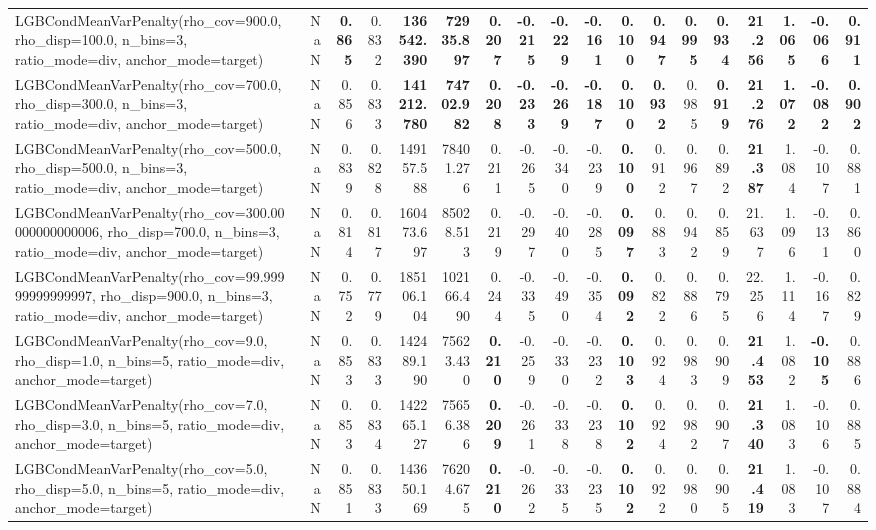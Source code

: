 \documentclass[11pt]{article}
\theoremstyle{plain}
\theoremstyle{definition}
\newcommand{\1}{\mathbf{1}}
\begin{document}
\begin{table}[htbp]
{\begin{tabular}{lrrrrrrrrrrrrrrrrr}
LGBCondMeanVarPenalty(rho\_cov=900.0, rho\_disp=100.0, n\_bins=3, ratio\_mode=div, anchor\_mode=target) & NaN & \textbf{0.865} & 0.832 & \textbf{136542.390} & \textbf{72935.897} & \textbf{0.207} & \textbf{-0.215} & \textbf{-0.229} & \textbf{-0.161} & \textbf{0.100} & \textbf{0.947} & \textbf{0.995} & \textbf{0.934} & \textbf{21.256} & \textbf{1.065} & \textbf{-0.066} & \textbf{0.911} \\
LGBCondMeanVarPenalty(rho\_cov=700.0, rho\_disp=300.0, n\_bins=3, ratio\_mode=div, anchor\_mode=target) & NaN & 0.856 & 0.833 & \textbf{141212.780} & \textbf{74702.982} & \textbf{0.208} & \textbf{-0.233} & \textbf{-0.269} & \textbf{-0.187} & \textbf{0.100} & \textbf{0.932} & 0.985 & \textbf{0.919} & \textbf{21.276} & \textbf{1.072} & \textbf{-0.082} & \textbf{0.902} \\
LGBCondMeanVarPenalty(rho\_cov=500.0, rho\_disp=500.0, n\_bins=3, ratio\_mode=div, anchor\_mode=target) & NaN & 0.839 & 0.828 & 149157.588 & 78401.276 & 0.211 & -0.265 & -0.340 & -0.239 & \textbf{0.100} & 0.912 & 0.967 & 0.892 & \textbf{21.387} & 1.084 & -0.107 & 0.881 \\
LGBCondMeanVarPenalty(rho\_cov=300.00000000000006, rho\_disp=700.0, n\_bins=3, ratio\_mode=div, anchor\_mode=target) & NaN & 0.814 & 0.817 & 160473.697 & 85028.513 & 0.219 & -0.297 & -0.400 & -0.285 & \textbf{0.097} & 0.883 & 0.942 & 0.859 & 21.637 & 1.096 & -0.131 & 0.860 \\
LGBCondMeanVarPenalty(rho\_cov=99.99999999999997, rho\_disp=900.0, n\_bins=3, ratio\_mode=div, anchor\_mode=target) & NaN & 0.752 & 0.779 & 185106.104 & 102166.490 & 0.244 & -0.335 & -0.490 & -0.354 & \textbf{0.092} & 0.822 & 0.886 & 0.795 & 22.256 & 1.114 & -0.167 & 0.829 \\
LGBCondMeanVarPenalty(rho\_cov=9.0, rho\_disp=1.0, n\_bins=5, ratio\_mode=div, anchor\_mode=target) & NaN & 0.853 & 0.833 & 142489.190 & 75623.430 & \textbf{0.210} & -0.259 & -0.330 & -0.232 & \textbf{0.103} & 0.924 & 0.983 & 0.909 & \textbf{21.453} & 1.082 & \textbf{-0.105} & 0.886 \\
LGBCondMeanVarPenalty(rho\_cov=7.0, rho\_disp=3.0, n\_bins=5, ratio\_mode=div, anchor\_mode=target) & NaN & 0.853 & 0.834 & 142265.127 & 75656.386 & \textbf{0.209} & -0.261 & -0.338 & -0.238 & \textbf{0.102} & 0.924 & 0.982 & 0.907 & \textbf{21.340} & 1.083 & -0.106 & 0.885 \\
LGBCondMeanVarPenalty(rho\_cov=5.0, rho\_disp=5.0, n\_bins=5, ratio\_mode=div, anchor\_mode=target) & NaN & 0.851 & 0.833 & 143650.169 & 76204.675 & \textbf{0.210} & -0.262 & -0.335 & -0.235 & \textbf{0.102} & 0.922 & 0.980 & 0.905 & \textbf{21.419} & 1.083 & -0.107 & 0.884 \\

\end{tabular}}
\end{table}
\end{document}
